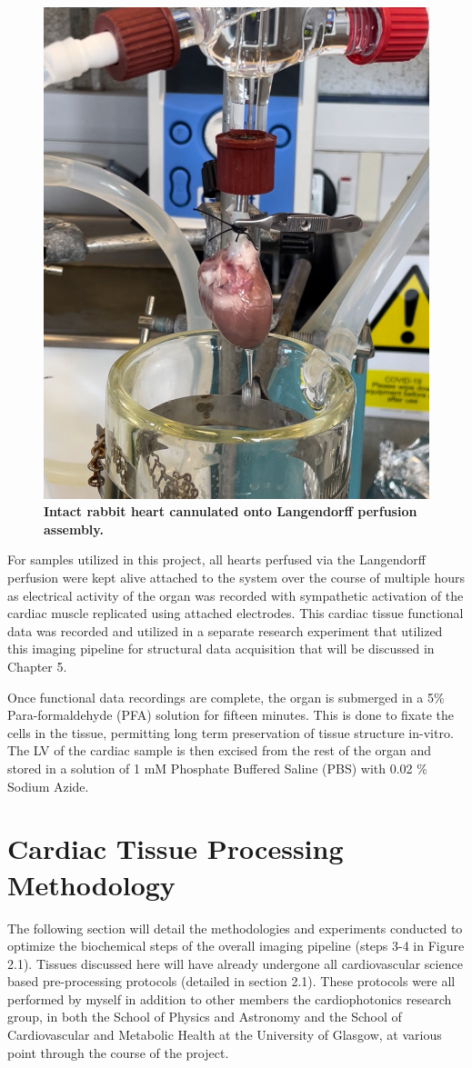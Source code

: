\begin{figure}[H]
    \centering
    \includegraphics[width=0.5\linewidth]{Figures/Fig2_3.jpeg}
    \caption{\textbf{Intact rabbit heart cannulated onto Langendorff perfusion assembly.}}
    \label{fig:enter-label}
\end{figure}

For samples utilized in this project, all hearts perfused via the Langendorff perfusion were kept alive attached to the system over the course of multiple hours as electrical activity of the organ was recorded with sympathetic activation of the cardiac muscle replicated using attached electrodes. This cardiac tissue functional data was recorded and utilized in a separate research experiment that utilized this imaging pipeline for structural data acquisition that will be discussed in Chapter 5.

Once functional data recordings are complete, the organ is submerged in a 5\% Para-formaldehyde (PFA) solution for fifteen minutes. This is done to fixate the cells in the tissue, permitting long term preservation of tissue structure in-vitro. The LV of the cardiac sample is then excised from the rest of the organ and stored in a solution of 1 mM Phosphate Buffered Saline (PBS) with 0.02 \% Sodium Azide.

\section{Cardiac Tissue Processing Methodology}

The following section will detail the methodologies and experiments conducted to optimize the biochemical steps of the overall imaging pipeline (steps 3-4 in Figure 2.1). Tissues discussed here will have already undergone all cardiovascular science based pre-processing protocols (detailed in section 2.1). These protocols were all performed by myself in addition to other members the cardiophotonics research group, in both the School of Physics and Astronomy and the School of Cardiovascular and Metabolic Health at the University of Glasgow, at various point through the course of the project. 

